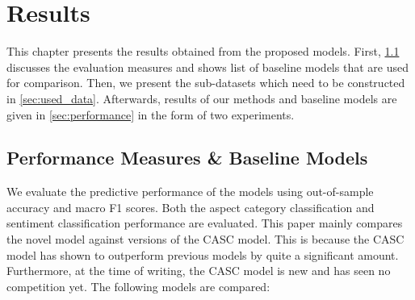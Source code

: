 \documentclass[american, oneside]{ecsgdp}
\begin{document}


\chapter{Results} \label{chap:results}
This chapter presents the results obtained from the proposed models. First, \cref{sec:baselines} discusses the evaluation measures and shows list of baseline models that are used for comparison. Then, we present the sub-datasets which need to be constructed in \cref{sec:used_data}. Afterwards, results of our methods and baseline models are given in \cref{sec:performance} in the form of two experiments.

\section{Performance Measures \& Baseline Models} \label{sec:baselines}
We evaluate the predictive performance of the models using out-of-sample accuracy and macro F1 scores. Both the aspect category classification and sentiment classification performance are evaluated. This paper mainly compares the novel model against versions of the CASC model. This is because the CASC model has shown to outperform previous models by quite a significant amount. Furthermore, at the time of writing, the CASC model is new and has seen no competition yet. The following models are compared:
\end{document}
